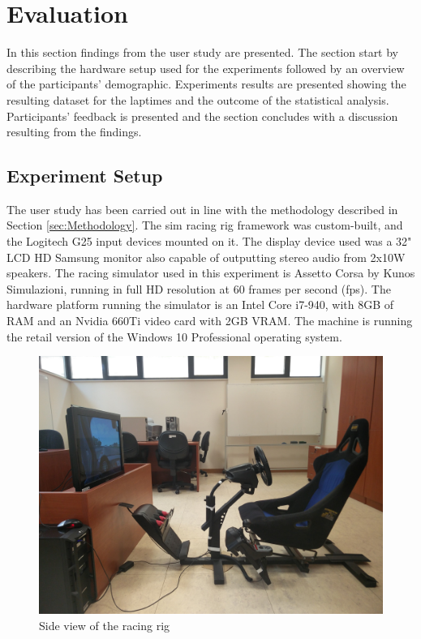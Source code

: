 \documentclass{sig-alternate}
\begin{document}
\section{Evaluation} {
\label{sec:Evaluation}

In this section findings from the user study are presented. The section start by describing the hardware setup used for the experiments followed by an overview of the participants' demographic. Experiments results are presented showing the resulting dataset for the laptimes and the outcome of the statistical analysis. Participants' feedback is presented and the section concludes with a discussion resulting from the findings.

\subsection{Experiment Setup}
The user study has been carried out in line with the methodology described in Section \ref{sec:Methodology}. The sim racing rig framework was custom-built, and the Logitech G25 input devices mounted on it. The display device used was a 32" LCD HD Samsung monitor also capable of outputting stereo audio from 2x10W speakers. The racing simulator used in this experiment is Assetto Corsa by Kunos Simulazioni, running in full HD resolution at 60 frames per second (fps). The hardware platform running the simulator is an Intel Core i7-940, with 8GB of RAM and an Nvidia 660Ti video card with 2GB VRAM. The machine is running the retail version of the Windows 10 Professional operating system.

\begin{figure}[!htb]
	\centering
	\begin{minipage}{0.45\textwidth}
		\centering
		\includegraphics[width=\textwidth]{images/RacingRig}
	\end{minipage}\hfill
	\caption[Side view of the racing rig]{Side view of the racing rig}
	\label{sec:eval-simRacingRig}
\end{figure}

}
\end{document}
